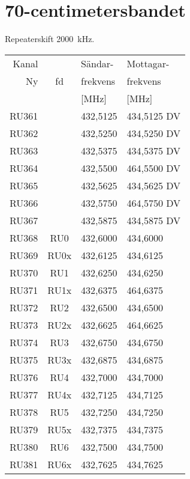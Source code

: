 \newpage

\section{70-centimetersbandet}
Repeaterskift \SI{2000}{\kilo\hertz}.

\begin{tabular}{ r | c | l | l }
	Kanal &       & Sändar-        & Mottagar-  \\
	Ny    & fd    & frekvens       & frekvens \\
          &       & [\si{\mega\hertz}] & [\si{\mega\hertz}] \\
	\hline
	RU361 &       & 432,5125       & 434,5125 DV    \\
	RU362 &       & 432,5250       & 434,5250 DV    \\
	RU363 &       & 432,5375       & 434,5375 DV    \\
	RU364 &       & 432,5500       & 464,5500 DV    \\
	RU365 &       & 432,5625       & 434,5625 DV    \\
	RU366 &       & 432,5750       & 464,5750 DV    \\
	RU367 &       & 432,5875       & 434,5875 DV    \\
	RU368 & RU0   & 432,6000       & 434,6000       \\
	RU369 & RU0x  & 432,6125       & 434,6125       \\
	RU370 & RU1   & 432,6250       & 434,6250       \\
	RU371 & RU1x  & 432,6375       & 464,6375       \\
	RU372 & RU2   & 432,6500       & 434,6500       \\
	RU373 & RU2x  & 432,6625       & 464,6625       \\
	RU374 & RU3   & 432,6750       & 434,6750       \\
	RU375 & RU3x  & 432,6875       & 434,6875       \\
	RU376 & RU4   & 432,7000       & 434,7000       \\
	RU377 & RU4x  & 432,7125       & 434,7125       \\
	RU378 & RU5   & 432,7250       & 434,7250       \\
	RU379 & RU5x  & 432,7375       & 434,7375       \\
	RU380 & RU6   & 432,7500       & 434,7500       \\
	RU381 & RU6x  & 432,7625       & 434,7625       \\

\end{tabular}
